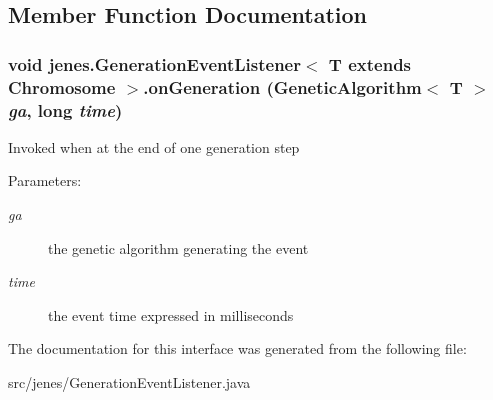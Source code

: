 \subsection{Member Function Documentation}
\hypertarget{interfacejenes_1_1_generation_event_listener_3_01_t_01extends_01_chromosome_01_4_ae224991bea21e4eca0f81ce0fb464e9}{
\subsubsection[onGeneration]{\setlength{\rightskip}{0pt plus 5cm}void jenes.GenerationEventListener$<$ T extends Chromosome $>$.onGeneration (GeneticAlgorithm$<$ T $>$ {\em ga}, \/  long {\em time})}}
\label{interfacejenes_1_1_generation_event_listener_3_01_t_01extends_01_chromosome_01_4_ae224991bea21e4eca0f81ce0fb464e9}


Invoked when at the end of one generation step

\begin{Desc}
\item[Parameters:]
\begin{description}
\item[{\em ga}]the genetic algorithm generating the event \item[{\em time}]the event time expressed in milliseconds \end{description}
\end{Desc}


The documentation for this interface was generated from the following file:\begin{CompactItemize}
\item 
src/jenes/GenerationEventListener.java\end{CompactItemize}
